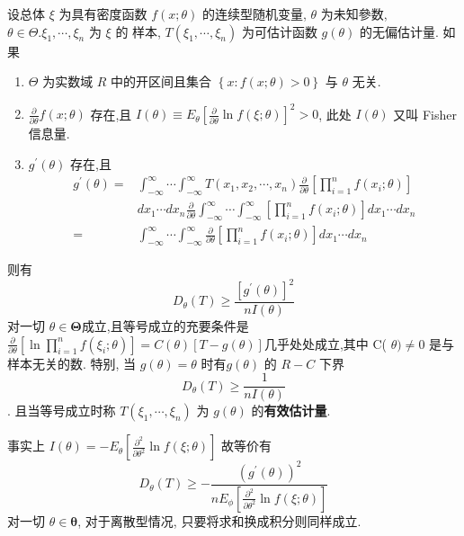 \documentclass[10pt]{yerbaformat}
\begin{document}
\begin{theorem}{\label{cr}}
    设总体 $\xi$ 为具有密度函数 $f(x ; \theta)$ 的连续型随机变量, $\theta$ 为未知參数, $\theta \in \Theta . \xi_{1}, \cdots, \xi_{n}$ 为 $\xi$ 的 样本, $T\left(\xi_{1}, \cdots, \xi_{n}\right)$ 为可估计函数 $g(\theta)$ 的无偏估计量. 如果
    \begin{enumerate}
        \item $\Theta$ 为实数域 $R$ 中的开区间且集合 $\left\{x: f(x; \theta)>0 \right\}$ 与 $\theta$ 无关.
        \item $\frac{\partial}{\partial \theta} f(x ; \theta)$ 存在,且 $I(\theta) \equiv E_{\theta}\left[\frac{\partial}{\partial \theta} \ln f(\xi ; \theta)\right]^{2}>0$, 此处 $I(\theta)$ 又叫 Fisher 信息量.
        \item $g^{\prime}(\theta)$ 存在,且$$\begin{aligned}
                      g^{\prime}(\theta)= & \int_{-\infty}^{\infty} \cdots \int_{-\infty}^{\infty} T\left(x_{1}, x_{2}, \cdots, x_{n}\right) \frac{\partial}{\partial \theta}\left[\prod_{i=1}^{n} f\left(x_{i} ; \theta\right)\right]     \\
                                          & d x_{1} \cdots d x_{n} \frac{\partial}{\partial \theta} \int_{-\infty}^{\infty} \cdots \int_{-\infty}^{\infty}\left[\prod_{i=1}^{n} f\left(x_{i} ; \theta\right)\right] d x_{1} \cdots d x_{n} \\
                      =                   & \int_{-\infty}^{\infty} \cdots \int_{-\infty}^{\infty} \frac{\partial}{\partial \theta}\left[\prod_{i=1}^{n} f\left(x_{i} ; \theta\right)\right] d x_{1} \cdots d x_{n}
                  \end{aligned}$$
    \end{enumerate}
    则有$$D_{\theta}(T) \geqslant \frac{\left[g^{\prime}(\theta)\right]^{2}}{n I(\theta)}$$ 对一切 $\theta \in \boldsymbol{\Theta}$成立,且等号成立的充要条件是$\frac{\partial}{\partial \theta}\left[\ln \prod_{i=1}^{n} f\left(\xi_{i} ; \theta\right)\right]=C(\theta)[T-g(\theta)]$几乎处处成立,其中 C( $\theta) \neq 0$ 是与样本无关的数. 特别, 当 $g(\theta)=\theta$ 时有$g(\theta)$ 的 $R-C$ 下界$$D_{\theta}(T) \geqslant \frac{1}{n I(\theta)}$$. 且当等号成立时称 $T\left(\xi_{1}, \cdots, \xi_{n}\right)$ 为 $g(\theta)$ 的\textbf{有效估计量}.
\end{theorem}

\par 事实上 $I(\theta)=-E_{\theta}\left[\frac{\partial^{2}}{\partial \theta^{2}} \ln f(\xi ; \theta)\right]$ 故等价有 $$D_{\theta}(T) \geqslant-\frac{\left(g^{\prime}(\theta)\right)^{2}}{n E_{\phi}\left[\frac{\partial^{2}}{\partial \theta^{2}} \ln f(\xi ; \theta)\right]}$$ 对一切 $\theta \in \boldsymbol{\theta}$, 对于离散型情况, 只要将求和换成积分则同样成立.
\end{document}
